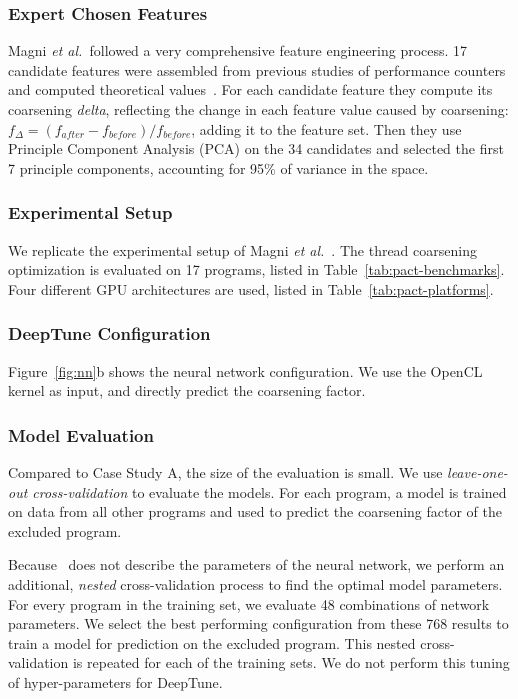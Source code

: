 

\subsubsection{Expert Chosen Features} Magni \emph{et al.\ }followed a very comprehensive feature engineering process. 17 candidate features were assembled from previous studies of performance counters and computed theoretical values~\cite{Magni2,Sim2012}. For each candidate feature they compute its coarsening \emph{delta}, reflecting the change in each feature value caused by coarsening: $f_{\Delta} = (f_{after} - f_{before}) / f_{before}$, adding it to the feature set. Then they use Principle Component Analysis (PCA) on the 34 candidates and selected the first 7 principle components, accounting for 95\% of variance in the space.

\subsubsection{Experimental Setup} We replicate the experimental setup of Magni \emph{et al.}~\cite{Magni2014}. The thread coarsening optimization is evaluated on 17 programs, listed in Table~\ref{tab:pact-benchmarks}. Four different GPU architectures are used, listed in Table~\ref{tab:pact-platforms}.

\subsubsection{DeepTune Configuration} Figure~\ref{fig:nn}b shows the neural network configuration. We use the OpenCL kernel as input, and directly predict the coarsening factor.

\subsubsection{Model Evaluation} Compared to Case Study A, the size of the evaluation is small. We use \emph{leave-one-out cross-validation} to evaluate the models. For each program, a model is trained on data from all other programs and used to predict the coarsening factor of the excluded program.

Because~\cite{Magni2014} does not describe the parameters of the neural network, we perform an additional, \emph{nested} cross-validation process to find the optimal model parameters. For every program in the training set, we evaluate 48 combinations of network parameters. We select the best performing configuration from these 768 results to train a model for prediction on the excluded program. This nested cross-validation is repeated for each of the training sets. We do not perform this tuning of hyper-parameters for DeepTune.


